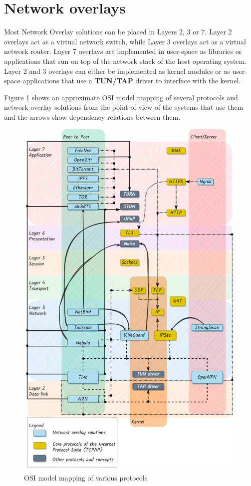 \hypertarget{thesis__020-related-work.md__network-overlays}{%
\section{Network
overlays}\label{thesis__020-related-work.md__network-overlays}}

Most Network Overlay solutions can be placed in Layers 2, 3 or 7. Layer
2 overlays act as a virtual network switch, while Layer 3 overlays act
as a virtual network router. Layer 7 overlays are implemented in
user-space as libraries or applications that run on top of the network
stack of the host operating system. Layer 2 and 3 overlays can either be
implemented as kernel modules or as user-space applications that use a
\textbf{TUN/TAP} driver to interface with the kernel.

Figure \ref{osi-map-overlays} shows an approximate OSI model mapping of
several protocols and network overlay solutions from the point of view
of the systems that use them and the arrows show dependency relations
between them.

\begin{figure}
\centering
\includegraphics[width=\textwidth,height=0.9\textheight]{thesis/../figures/osi-map-overlays.png}
\caption{OSI model mapping of various protocols
\label{osi-map-overlays}}
\end{figure}

